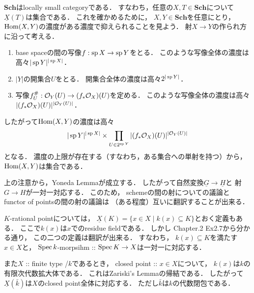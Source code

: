 \documentclass[a4paper]{jsarticle}
\newcommand{\Sch}{\mathbf{Sch}}
\newcommand{\func}[1]{\underline{#1}}
\begin{document}
    \begin{Remark}
        $\Sch$はlocally small categoryである．
        すなわち，任意の$X, T \in \Sch$について$\func{X}(T)$は集合である．
        これを確かめるために，
        $X, Y \in \Sch$を任意にとり，
        $\operatorname{Hom}(X,Y)$の濃度がある濃度で抑えられることを見よう．
        射$X \to Y$の作られ方に沿って考える．
        \begin{enumerate}[label=(\arabic*), leftmargin=*]
        \item
            base spaceの間の写像$f: \operatorname{sp} X \to \operatorname{sp} Y$をとる．
            このような写像全体の濃度は高々$|\operatorname{sp} Y|^{|\operatorname{sp} X|}$．
        \item
            $|Y|$の開集合$U$をとる．
            開集合全体の濃度は高々$2^{|\operatorname{sp} Y|}$．
        \item
            写像$f^{\#}_U: \mathcal{O}_Y(U) \to (f_* \mathcal{O}_X)(U)$を定める．
            このような写像全体の濃度は高々$|(f_* \mathcal{O}_X)(U)|^{|\mathcal{O}_Y(U)|}$．
        \end{enumerate}
        したがって$\operatorname{Hom}(X,Y)$の濃度は高々
        \[|\operatorname{sp} Y|^{|\operatorname{sp} X|} \times \prod_{U \in 2^{\operatorname{sp} Y}} |(f_* \mathcal{O}_X)(U)|^{|\mathcal{O}_Y(U)|} \]
        となる．
        濃度の上限が存在する（すなわち，ある集合への単射を持つ）から，
        $\operatorname{Hom}(X,Y)$は集合である．
    \end{Remark}

    \begin{Remark}
        上の注意から，Yoneda Lemmaが成立する．
        したがって自然変換$\func{G} \to \func{H}$と
        射$G \to H$が一対一対応する．
        このため，
        schemeの間の射についての議論と
        functor of pointsの間の射の議論は
        （ある程度）互いに翻訳することが出来る．
    \end{Remark}

    \begin{Remark}
        $K$-rational pointについては，
        $\func{X}(K)=\{ x \in X \mid k(x) \subseteq K \}$とおく定義もある．
        ここで$k(x)$は$x$でのresidue fieldである．
        しかし\cite{HarAG} Chapter.2 Ex2.7から分かる通り，
        この二つの定義は翻訳が出来る．
        すなわち，
        $k(x) \subseteq K$を満たす$x \in X$と，
        $\operatorname{Spec} k$-morpsihm :: $\operatorname{Spec} K \to X$は一対一に対応する．

        また$X$ :: finite type /$k$であるとき，
        closed point :: $x \in X$について，
        $k(x)$は$k$の有限次代数拡大体である．
        これはZariski's Lemmaの帰結である．
        したがって$\func{X}(\bar{k})$は$X$のclosed point全体に対応する．
        ただし$\bar{k}$は$k$の代数閉包である．
    \end{Remark}
\end{document}
